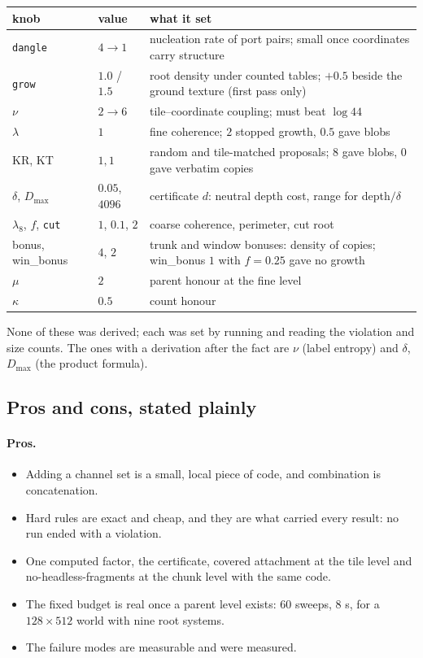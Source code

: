 \documentclass[11pt]{article}
\newcommand{\1}{\mathds{1}}
\newcommand{\code}[1]{\texttt{#1}}
\begin{document}
\begin{center}\small
\begin{tabular}{@{}l l p{3.3in}@{}}
\toprule
knob & value & what it set \\
\midrule
\code{dangle} & $4 \to 1$ & nucleation rate of port pairs; small once coordinates carry structure \\
\code{grow} & $1.0$ / $1.5$ & root density under counted tables; $+0.5$ beside the ground texture (first pass only) \\
$\nu$ & $2 \to 6$ & tile--coordinate coupling; must beat $\log 44$ \\
$\lambda$ & $1$ & fine coherence; $2$ stopped growth, $0.5$ gave blobs \\
KR, KT & $1, 1$ & random and tile-matched proposals; $8$ gave blobs, $0$ gave verbatim copies \\
$\delta$, $D_{\max}$ & $0.05$, $4096$ & certificate $d$: neutral depth cost, range for depth$/\delta$ \\
$\lambda_8$, $f$, \code{cut} & $1$, $0.1$, $2$ & coarse coherence, perimeter, cut root \\
bonus, win\_bonus & $4$, $2$ & trunk and window bonuses: density of copies; win\_bonus $1$ with $f = 0.25$ gave no growth \\
$\mu$ & $2$ & parent honour at the fine level \\
$\kappa$ & $0.5$ & count honour \\
\bottomrule
\end{tabular}
\end{center}
None of these was derived; each was set by running and reading the
violation and size counts. The ones with a derivation after the fact are
$\nu$ (label entropy) and $\delta$, $D_{\max}$ (the product formula).

\subsection{Pros and cons, stated plainly}

\paragraph{Pros.}
\begin{itemize}
\item Adding a channel set is a small, local piece of code, and
  combination is concatenation.
\item Hard rules are exact and cheap, and they are what carried every
  result: no run ended with a violation.
\item One computed factor, the certificate, covered attachment at the tile
  level and no-headless-fragments at the chunk level with the same code.
\item The fixed budget is real once a parent level exists: 60 sweeps, 8 s,
  for a $128 \times 512$ world with nine root systems.
\item The failure modes are measurable and were measured.
\end{itemize}
\end{document}
